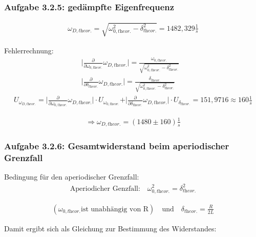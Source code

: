 \documentclass[a4paper]{scrartcl}
\numberwithin{equation}{subsection}
\begin{document}
\subsubsection{Aufgabe 3.2.5: gedämpfte Eigenfrequenz}

\begin{align}
\omega_{D,\textit{theor.}} = \sqrt{\omega_{0,\textit{theor.}}^2 - \delta_{\textit{theor.}}^2} = 1482,329 \frac{1}{s}
\end{align}

Fehlerrechnung:
\begin{align*}
\vert \frac{\partial}{\partial \omega_{0,\textit{theor.}}}\omega_{D,\textit{theor.}}\vert = \frac{\omega_{0,\textit{theor.}}}{\sqrt{\omega_{0,\textit{theor.}}^2 - \delta_{\textit{theor.}}^2}} &\\
\vert \frac{\partial}{\partial \delta_{\textit{theor.}}}\omega_{D,\textit{theor.}}\vert = \frac{\delta_{\textit{theor.}}}{\sqrt{\omega_{0,\textit{theor.}}^2 - \delta_{\textit{theor.}}^2}} &
\end{align*}
\begin{align*}
U_{\omega_{D,\textit{theor.}}} = \vert \frac{\partial}{\partial \omega_{0,\textit{theor.}}}\omega_{D,\textit{theor.}}\vert \cdot U_{\omega_{0,\textit{theor.}}} + \vert \frac{\partial}{\partial \delta_{\textit{theor.}}}\omega_{D,\textit{theor.}}\vert \cdot U_{\delta_{\textit{theor.}}} = 151,9716 \approx 160 \frac{1}{s}
\end{align*}

\begin{align*}
\Rightarrow \omega_{D,\textit{theor.}} = (1480 \pm 160) \frac{1}{s}
\end{align*}

\subsubsection{Aufgabe 3.2.6: Gesamtwiderstand beim aperiodischer Grenzfall}

Bedingung für den aperiodischer Grenzfall:
\begin{align}
\text{Aperiodicher Genzfall:} \quad \omega_{0,\textit{theor.}}^2 = \delta_{\textit{theor.}}^2
\end{align}

\begin{align*}
(\omega_{0,\textit{theor.}} \text{ist unabhängig von R}) \quad \text{und} \quad
\delta_{\textit{theor.}} = \frac{R}{2L}
\end{align*}

Damit ergibt sich als Gleichung zur Bestimmung des Widerstandes:
\end{document}
